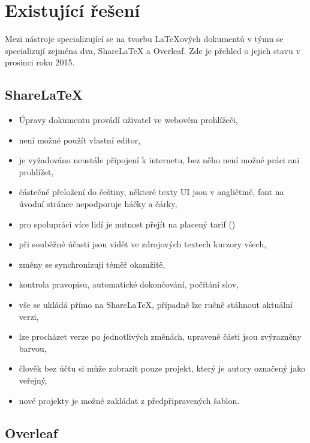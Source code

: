 \section{Existující řešení}

Mezi nástroje specializující se na tvorbu \LaTeX{ových} dokumentů v týmu se specializují zejména dva, ShareLaTeX a Overleaf. Zde je přehled o jejich stavu v prosinci roku 2015.

\subsection{ShareLaTeX}

\begin{itemize}
	\item Úpravy dokumentu provádí uživatel ve webovém prohlížeči,
	\item není možné použít vlastní editor,
	\item je vyžadováno neustále připojení k internetu, bez něho není možné práci ani prohlížet,
	\item částečné přeložení do češtiny, některé texty UI jsou v angličtině, font na úvodní stránce nepodporuje háčky a čárky,
	\item pro spolupráci více lidí je nutnost přejít na placený tarif ()
	\item při souběžné účasti jsou vidět ve zdrojových textech kurzory všech,
	\item změny se synchronizují téměř okamžitě,
	\item kontrola pravopisu, automatické dokončování, počítání slov,
	\item vše se ukládá přímo na ShareLaTeX, případně lze ručně stáhnout aktuální verzi,
	\item lze procházet verze po jednotlivých změnách, upravené části jsou zvýrazněny barvou,
	\item člověk bez účtu si může zobrazit pouze projekt, který je autory označený jako veřejný,
	\item nové projekty je možné zakládat z předpřipravených šablon.
\end{itemize}


\subsection{Overleaf}

